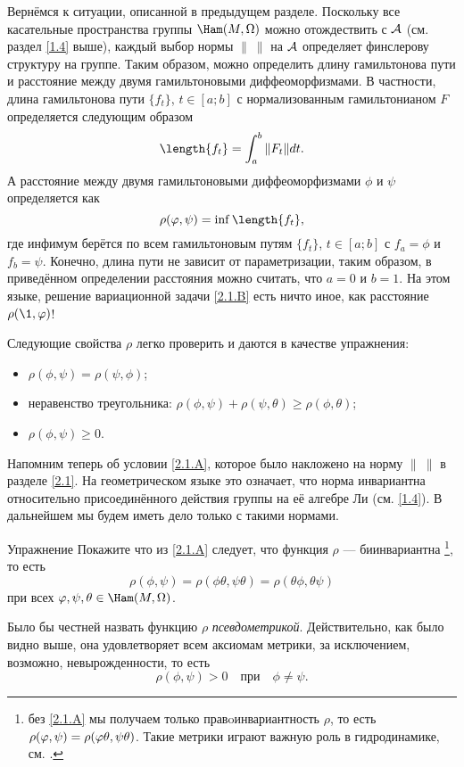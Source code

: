 Вернёмся к ситуации, описанной в предыдущем разделе.
Поскольку все касательные пространства группы $\Ham(M, \Omega)$ можно
отождествить с $\mathcal{A}$ (см. раздел \ref{1.4} выше), каждый выбор нормы
$\|\ \|$ на $\mathcal{A}$ определяет финслерову структуру на группе.
Таким образом, можно определить длину гамильтонова пути и расстояние между двумя гамильтоновыми диффеоморфизмами.
В частности, длина гамильтонова пути $\{f_t\}$, $t \in [a; b]$ с нормализованным гамильтонианом $F$ определяется следующим образом 
\[\length\{f_t\}=\int_a^b \| F_t \| dt.\]
А расстояние между двумя гамильтоновыми диффеоморфизмами $\phi$ и $\psi$ определяется как
\[\rho (\phi, \psi) = \inf \length \{f_t\},\] 
где инфимум берётся по всем гамильтоновым путям $\{f_t\}$, $t \in [a; b]$ с $f_a = \phi$ и $f_b = \psi$.
Конечно, длина пути не зависит от параметризации, таким образом, в приведённом определении расстояния можно считать, что $a = 0$ и $b = 1$.
На этом языке, решение вариационной задачи
\ref{2.1.B} есть ничто иное, как расстояние $\rho (\1, \phi)$!

Следующие свойства $\rho$ легко проверить и даются в качестве упражнения:
\begin{itemize}
\item $\rho (\phi, \psi) = \rho (\psi, \phi)$;
\item неравенство треугольника: $\rho (\phi, \psi) + \rho (\psi, \theta) \ge \rho (\phi, \theta)$;
\item $\rho (\phi, \psi) \ge 0$.
\end{itemize}

Напомним теперь об условии \ref{2.1.A}, которое было накложено на норму $\|\ \|$ в разделе \ref{2.1}.
На геометрическом языке это означает, что норма инвариантна относительно присоединённого действия группы на её алгебре Ли (см. \ref{1.4}).
В дальнейшем мы будем иметь дело только с такими нормами.

\begin{thm*}{Упражнение}
Покажите что из \ref{2.1.A} следует, что функция $\rho$ --- биинвариантна%
\footnote{без \ref{2.1.A} мы получаем только правoинвариантность $\rho$, то есть $\rho (\phi, \psi) \z= \rho (\phi\theta, \psi\theta)$.
Такие метрики играют важную роль в гидродинамике, см. \cite{AK}.},
то есть
\[\rho (\phi, \psi) = \rho (\phi \theta, \psi \theta) = \rho (\theta\phi, \theta\psi)\]
при всех $\phi, \psi, \theta \in \Ham (M, \Omega)$.
\end{thm*}

Было бы честней назвать функцию $\rho$ \emph{псевдометрикой}.
Действительно, как было видно выше, она удовлетворяет всем аксиомам метрики, за исключением, возможно, невырожденности, то есть 
\begin{equation}
\rho (\phi, \psi)> 0
\quad\text{при}\quad
\phi \ne \psi.
\label{eq:2.2.A}
\end{equation}


